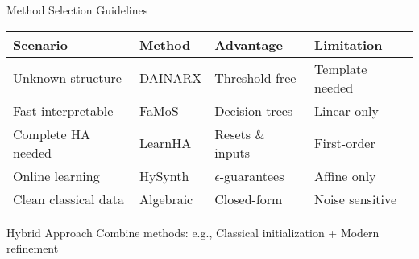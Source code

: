 \documentclass[aspectratio=169]{beamer}
\begin{document}
\begin{frame}{Method Selection Guidelines}
\vspace{-0.2cm}
\begin{center}
\small
\begin{tabular}{|l|l|l|l|}
\hline
\textbf{Scenario} & \textbf{Method} & \textbf{Advantage} & \textbf{Limitation} \\
\hline
Unknown structure & DAINARX & Threshold-free & Template needed \\
Fast interpretable & FaMoS & Decision trees & Linear only \\
Complete HA needed & LearnHA & Resets \& inputs & First-order \\
Online learning & HySynth & $\epsilon$-guarantees & Affine only \\
Clean classical data & Algebraic & Closed-form & Noise sensitive \\
\hline
\end{tabular}
\end{center}

\vspace{0.3cm}
\begin{alertblock}{Hybrid Approach}
Combine methods: e.g., Classical initialization + Modern refinement
\end{alertblock}
\end{frame}
\end{document}

